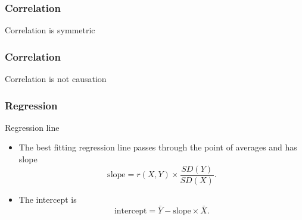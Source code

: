 \documentclass[handout]{beamer}
\begin{document}
   \begin{frame}
   \frametitle{Correlation}
   \begin{center}
   \end{center}
   Correlation is symmetric
   \end{frame}



   \begin{frame}
   \frametitle{Correlation}
   \begin{center}
   \end{center}
   Correlation is not causation
   \end{frame}


   \begin{frame} \frametitle{Regression}

   \begin{block}
   {Regression line}
   \begin{itemize}
   \item    The best fitting regression line
   passes through
   the point of averages and has slope
   $$
   \text{slope} = r(X,Y) \times \frac{SD(Y)}{SD(X)}.
   $$
   \item The intercept is
   $$
   \text{intercept} = \bar{Y} - \text{slope} \times \bar{X}.
   $$
   \end{itemize}

   \end{block}
   \end{frame}
\end{document}
